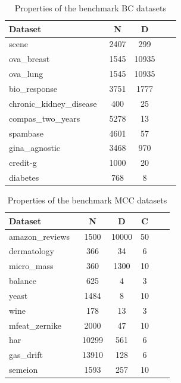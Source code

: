 \documentclass[3p,review,authoryear]{elsarticle}
\begin{document}
\begin{table}[h!]
\centering
\caption{Properties of the benchmark BC datasets}
\label{tab:str}
\begin{tabular}{@{}lcccc@{}}
\toprule
\textbf{Dataset}   & \textbf{N} & \textbf{D} \\ \midrule
scene~\citep{mulan}                  & 2407         & 299          \\
ova\_breast~\citep{openml}                     & 1545         & 10935          \\
ova\_lung~\citep{openml}                   & 1545         & 10935             \\
bio\_response~\citep{openml}                   & 3751         & 1777          \\
chronic\_kidney\_disease~\citep{openml}                   & 400         & 25       \\
compas\_two\_years~\citep{openml}             &  5278        & 13          \\
spambase~\citep{openml}                & 4601         & 57        \\
gina\_agnostic~\citep{openml}                  & 3468         & 970             \\
credit-g~\citep{openml}           & 1000         & 20            \\
diabetes\citep{openml}       & 768         & 8         \\ \bottomrule
\end{tabular}
\end{table}

\begin{table}[h!]
\centering
\caption{Properties of the benchmark MCC datasets}
\label{tab:mcc}
\begin{tabular}{@{}lccccc@{}}
\toprule
\textbf{Dataset}   & \textbf{N} & \textbf{D} & \textbf{C}     \\ \midrule
amazon\_reviews~\citep{openml}                  & 1500         & 10000   &  50     \\
dermatology~\citep{openml}                     & 366         & 34     &  6   \\
micro\_mass~\citep{openml}                   & 360         & 1300      &   10    \\
balance~\citep{openml}                   & 625         & 4       & 3  \\
yeast~\citep{mulan}                   & 1484         & 8    & 10  \\
wine~\citep{openml}             &  178        & 13     &  3   \\
mfeat\_zernike~\citep{openml}                & 2000         & 47   &  10   \\
har~\citep{openml}                  & 10299         & 561        &  6   \\
gas\_drift~\citep{openml}           & 13910         & 128      &   6   \\
semeion~\citep{openml}       & 1593         & 257    &   10  \\ \bottomrule
\end{tabular}
\end{table}
\end{document}

